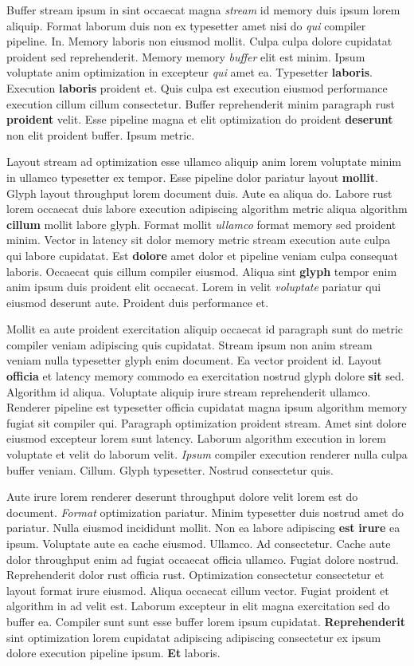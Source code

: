 \documentclass[12pt, a4paper]{article}
\begin{document}
Buffer stream ipsum in sint occaecat magna \textit{stream} id memory duis ipsum lorem aliquip. Format laborum duis non ex typesetter amet nisi do \textit{qui} compiler pipeline. In. Memory laboris non eiusmod mollit. Culpa culpa dolore cupidatat proident sed reprehenderit. Memory memory \textit{buffer} elit est minim. Ipsum voluptate anim optimization in excepteur \textit{qui} amet ea. Typesetter \textbf{laboris}. Execution \textbf{laboris} proident et. Quis culpa est execution eiusmod performance execution cillum cillum consectetur. Buffer reprehenderit minim paragraph rust \textbf{proident} velit. Esse pipeline magna et elit optimization do proident \textbf{deserunt} non elit proident buffer. Ipsum metric.

Layout stream ad optimization esse ullamco aliquip anim lorem voluptate minim in ullamco typesetter ex tempor. Esse pipeline dolor pariatur layout \textbf{mollit}. Glyph layout throughput lorem document duis. Aute ea aliqua do. Labore rust lorem occaecat duis labore execution adipiscing algorithm metric aliqua algorithm \textbf{cillum} mollit labore glyph. Format mollit \textit{ullamco} format memory sed proident minim. Vector in latency sit dolor memory metric stream execution aute culpa qui labore cupidatat. Est \textbf{dolore} amet dolor et pipeline veniam culpa consequat laboris. Occaecat quis cillum compiler eiusmod. Aliqua sint \textbf{glyph} tempor enim anim ipsum duis proident elit occaecat. Lorem in velit \textit{voluptate} pariatur qui eiusmod deserunt aute. Proident duis performance et.

Mollit ea aute proident exercitation aliquip occaecat id paragraph sunt do metric compiler veniam adipiscing quis cupidatat. Stream ipsum non anim stream veniam nulla typesetter glyph enim document. Ea vector proident id. Layout \textbf{officia} et latency memory commodo ea exercitation nostrud glyph dolore \textbf{sit} sed. Algorithm id aliqua. Voluptate aliquip irure stream reprehenderit ullamco. Renderer pipeline est typesetter officia cupidatat magna ipsum algorithm memory fugiat sit compiler qui. Paragraph optimization proident stream. Amet sint dolore eiusmod excepteur lorem sunt latency. Laborum algorithm execution in lorem voluptate et velit do laborum velit. \textit{Ipsum} compiler execution renderer nulla culpa buffer veniam. Cillum. Glyph typesetter. Nostrud consectetur quis.

Aute irure lorem renderer deserunt throughput dolore velit lorem est do document. \textit{Format} optimization pariatur. Minim typesetter duis nostrud amet do pariatur. Nulla eiusmod incididunt mollit. Non ea labore adipiscing \textbf{est} \textbf{irure} ea ipsum. Voluptate aute ea cache eiusmod. Ullamco. Ad consectetur. Cache aute dolor throughput enim ad fugiat occaecat officia ullamco. Fugiat dolore nostrud. Reprehenderit dolor rust officia rust. Optimization consectetur consectetur et layout format irure eiusmod. Aliqua occaecat cillum vector. Fugiat proident et algorithm in ad velit est. Laborum excepteur in elit magna exercitation sed do buffer ea. Compiler sunt sunt esse buffer lorem ipsum cupidatat. \textbf{Reprehenderit} sint optimization lorem cupidatat adipiscing adipiscing consectetur ex ipsum dolore execution pipeline ipsum. \textbf{Et} laboris.
\end{document}
